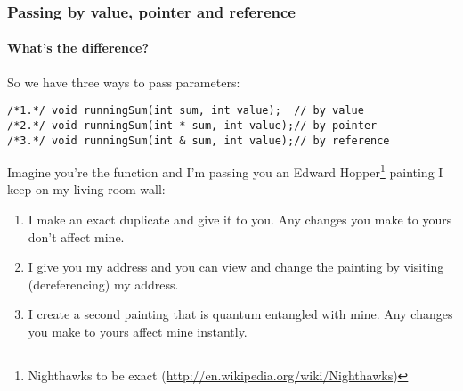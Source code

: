 \documentclass{beamer}
\begin{document}
\begin{frame}[fragile]
  \frametitle{Passing by value, pointer and reference}
  \framesubtitle{What's the difference?}
  
  So we have three ways to pass parameters:
  \begin{lstlisting}
/*1.*/ void runningSum(int sum, int value);  // by value
/*2.*/ void runningSum(int * sum, int value);// by pointer
/*3.*/ void runningSum(int & sum, int value);// by reference
  \end{lstlisting}
  Imagine you're the function and I'm passing you an Edward Hopper\footnote{Nighthawks to be exact (\url{http://en.wikipedia.org/wiki/Nighthawks})} painting I keep on my living room wall:
  \begin{enumerate}
  	\pause
    \item{I make an exact duplicate and give it to you.  Any changes you make to yours don't affect mine.}
    \pause
    \item{I give you my address and you can view and change the painting by visiting (dereferencing) my address.}
    \pause
  	\item{I create a second painting that is quantum entangled with mine.  Any changes you make to yours affect mine instantly.}
  \end{enumerate}

\end{frame}
\end{document}
